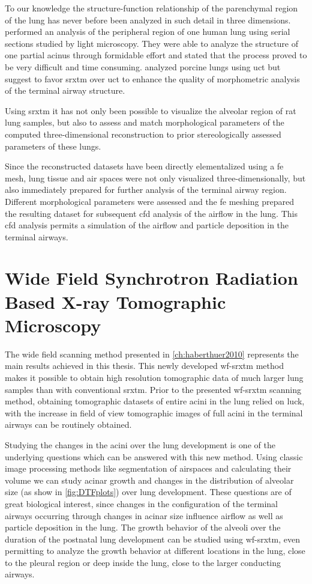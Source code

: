 To our knowledge the structure-function relationship of the parenchymal region of the lung has never before been analyzed in such detail in three dimensions. \citet{Berend1991} performed an analysis of the peripheral region of one human lung using serial sections studied by light microscopy. They were able to analyze the structure of one partial acinus through formidable effort and stated that the process proved to be very difficult and time consuming. \citet{Litzlbauer2006} analyzed porcine lungs using \ac{uct} but suggest to favor \ac{srxtm} over \ac{uct} to enhance the quality of morphometric analysis of the terminal airway structure.

Using \ac{srxtm} it has not only been possible to visualize the alveolar region of rat lung samples, but also to assess and match morphological parameters of the computed three-dimensional reconstruction to prior stereologically assessed parameters of these lungs.

Since the reconstructed datasets have been directly elementalized using a \ac{fe} mesh, lung tissue and air spaces were not only visualized three-dimensionally, but also immediately prepared for further analysis of the terminal airway region. Different morphological parameters were assessed and the \ac{fe} meshing prepared the resulting dataset for subsequent \ac{cfd} analysis of the airflow in the lung. This \ac{cfd} analysis permits a simulation of the airflow \cite{Filipovic2010} and particle deposition in the terminal airways.

\section{Wide Field Synchrotron Radiation Based X-ray Tomographic Microscopy}
The wide field scanning method presented in \autoref{ch:haberthuer2010} represents the main results achieved in this thesis. This newly developed \ac{wf-srxtm} method makes it possible to obtain high resolution tomographic data of much larger lung samples than with conventional \ac{srxtm}. Prior to the presented \ac{wf-srxtm} scanning method, obtaining tomographic datasets of entire acini in the lung relied on luck, with the increase in field of view tomographic images of full acini in the terminal airways can be routinely obtained. 

Studying the changes in the acini over the lung development is one of the underlying questions which can be answered with this new method. Using classic image processing methods like segmentation of airspaces and calculating their volume we can study acinar growth and changes in the distribution of alveolar size (as show in \autoref{fig:DTFplots}) over lung development. These questions are of great biological interest, since changes in the configuration of the terminal airways occurring through changes in acinar size influence airflow as well as particle deposition in the lung. The growth behavior of the alveoli over the duration of the postnatal lung development can be studied using \ac{wf-srxtm}, even permitting to analyze the growth behavior at different locations in the lung, \eg close to the pleural region or deep inside the lung, close to the larger conducting airways.

